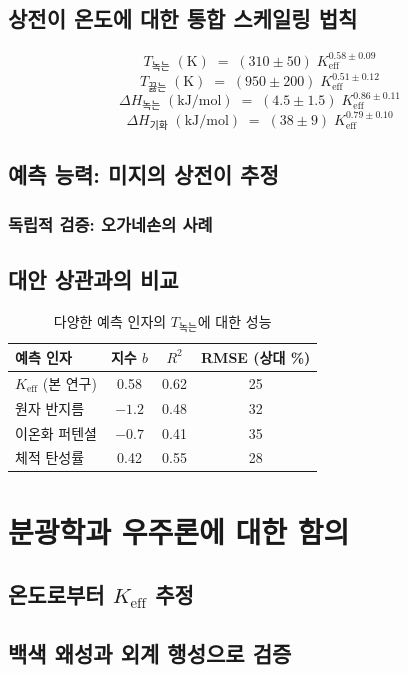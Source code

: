 \documentclass[11pt,a4paper]{article}
\newcommand{\Keff}{K_{\mathrm{eff}}}
\begin{document}
	\subsection{상전이 온도에 대한 통합 스케일링 법칙}
	\[
	\boxed{T_{\text{녹는}} \;(\mathrm{K}) \;=\; (310 \pm 50) \; \Keff^{0.58 \pm 0.09}}
	\]
	\[
	\boxed{T_{\text{끓는}} \;(\mathrm{K}) \;=\; (950 \pm 200) \; \Keff^{0.51 \pm 0.12}}
	\]
	\[
	\boxed{\Delta H_{\text{녹는}} \;(\mathrm{kJ/mol}) \;=\; (4.5 \pm 1.5) \; \Keff^{0.86 \pm 0.11}}
	\]
	\[
	\boxed{\Delta H_{\text{기화}} \;(\mathrm{kJ/mol}) \;=\; (38 \pm 9) \; \Keff^{0.79 \pm 0.10}}
	\]
	
	\subsection{예측 능력: 미지의 상전이 추정}
	\subsubsection{독립적 검증: 오가네손의 사례}
	\subsection{대안 상관과의 비교}
	
	\begin{table}[htbp]
		\centering
		\caption{다양한 예측 인자의 \(T_{\text{녹는}}\)에 대한 성능}
		\label{tab:comparison}
		\begin{tabular}{@{}lccc@{}}
			\toprule
			\textbf{예측 인자} & \textbf{지수 }\(b\) & \textbf{\(R^2\)} & \textbf{RMSE (상대 \%)} \\
			\midrule
			\(K_{\mathrm{eff}}\) (본 연구) & 0.58 & 0.62 & 25 \\
			원자 반지름 & \(-1.2\) & 0.48 & 32 \\
			이온화 퍼텐셜 & \(-0.7\) & 0.41 & 35 \\
			체적 탄성률 & 0.42 & 0.55 & 28 \\
			\bottomrule
		\end{tabular}
	\end{table}
	
	\section{분광학과 우주론에 대한 함의}
	\subsection{온도로부터 \(\Keff\) 추정}
	\subsection{백색 왜성과 외계 행성으로 검증}
\end{document}
